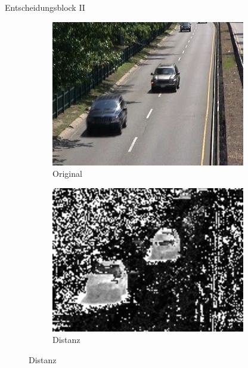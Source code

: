 \documentclass[hyperref={pdfpagelabels=false}]{beamer}
\begin{document}
\begin{frame}{Entscheidungsblock II}
	\begin{figure}
		\captionsetup[subfigure]{labelformat=empty}
		\begin{subfigure}{.3\linewidth}
			\centering
			\includegraphics[width=\linewidth]{./Bilder/decision_bilder/orig}
			\caption{Original}
		\end{subfigure}
		\hspace{5mm}
		\begin{subfigure}{.3\linewidth}
			\centering
			\includegraphics[width=\linewidth]{./Bilder/decision_bilder/distance}
			\caption{Distanz}
		\end{subfigure}
	

\end{figure}
\end{frame}
\end{document}
